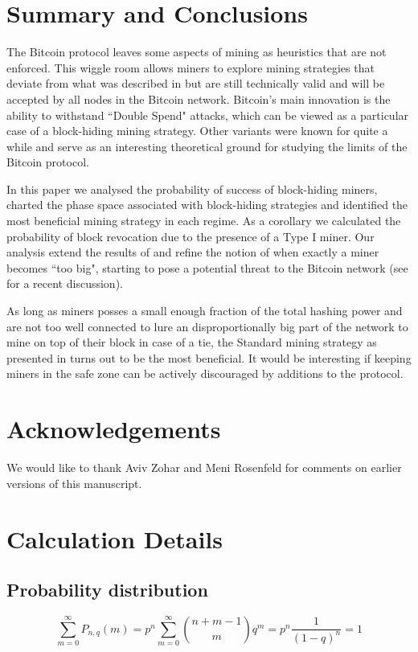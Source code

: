 \documentclass[letterpaper,12pt]{report}
\begin{document}
\chapter{Summary and Conclusions}
The Bitcoin protocol leaves some aspects of mining as heuristics that are not enforced. This wiggle room allows miners to explore mining strategies that deviate from what was described in \cite{Bitcoin} but are still technically valid and will be accepted by all nodes in the Bitcoin network. Bitcoin's  main innovation is the ability to withstand ``Double Spend" attacks, which can be viewed as a particular case of a block-hiding mining strategy. Other variants were known for quite a while \cite{Lear,Selfish} and serve as an interesting theoretical ground for studying the limits of the Bitcoin protocol. 
 
In this paper we analysed the probability of success of block-hiding miners, charted the phase space  associated with block-hiding strategies and identified the most beneficial mining strategy in each regime. As a corollary we calculated the probability of block revocation due to the presence of a Type I miner. Our analysis extend the results of \cite{Selfish} and refine the notion of when exactly a miner becomes ``too big", starting to pose a potential threat to the Bitcoin network (see \cite{Centralization} for a recent discussion). 

As long as miners posses a small enough fraction of the total hashing power and are not too well connected to lure an disproportionally big part of the network to mine on top of their block in case of a tie, the Standard mining strategy as presented in \cite{Bitcoin} turns out to be the most beneficial. It would be interesting if keeping miners in the safe zone can be actively discouraged by additions to the protocol.

\chapter{Acknowledgements}
We would like to thank Aviv Zohar and Meni Rosenfeld for comments on earlier versions of this manuscript.

\appendix
\chapter{Calculation Details}
\section{Probability distribution} \label{app:probmath}
\begin{equation}\nonumber
\sum_{m=0}^{\infty}\mathit{P}_{n,q}(m)=p^n\sum_{m=0}^{\infty}{n + m -1\choose m}q^m=p^n\dfrac{1}{(1-q)^n}=1
\end{equation}
\end{document}
